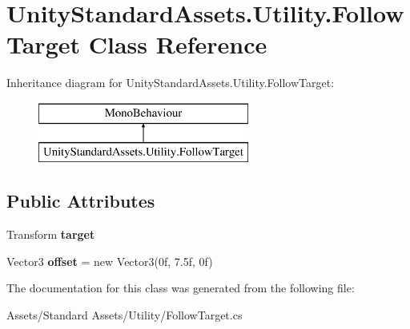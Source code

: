 \hypertarget{class_unity_standard_assets_1_1_utility_1_1_follow_target}{}\section{Unity\+Standard\+Assets.\+Utility.\+Follow\+Target Class Reference}
\label{class_unity_standard_assets_1_1_utility_1_1_follow_target}
Inheritance diagram for Unity\+Standard\+Assets.\+Utility.\+Follow\+Target\+:\begin{figure}[H]
\begin{center}
\leavevmode
\includegraphics[height=2.000000cm]{class_unity_standard_assets_1_1_utility_1_1_follow_target}
\end{center}
\end{figure}
\subsection*{Public Attributes}
\begin{DoxyCompactItemize}
\item 
Transform {\bfseries target}\hypertarget{class_unity_standard_assets_1_1_utility_1_1_follow_target_a4c2dbf9ba86180247a02197121179980}{}\label{class_unity_standard_assets_1_1_utility_1_1_follow_target_a4c2dbf9ba86180247a02197121179980}

\item 
Vector3 {\bfseries offset} = new Vector3(0f, 7.\+5f, 0f)\hypertarget{class_unity_standard_assets_1_1_utility_1_1_follow_target_a03ad3cd844ff4d6c20f71e356b4d5388}{}\label{class_unity_standard_assets_1_1_utility_1_1_follow_target_a03ad3cd844ff4d6c20f71e356b4d5388}

\end{DoxyCompactItemize}


The documentation for this class was generated from the following file\+:\begin{DoxyCompactItemize}
\item 
Assets/\+Standard Assets/\+Utility/Follow\+Target.\+cs\end{DoxyCompactItemize}
